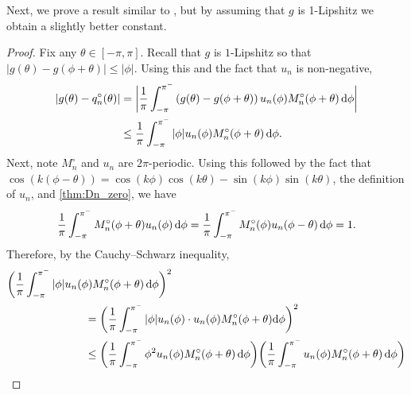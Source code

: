 Next, we prove a result similar to \cite[Lemma 1.7]{rivlin_81}, but by assuming that \( g \) is 1-Lipshitz we obtain a slightly better constant.


\begin{proof}
    Fix any \( \theta \in [-\pi,\pi] \).
    Recall that \( g \) is \( 1 \)-Lipshitz so that \( |g(\theta) - g(\phi+\theta)| \leq |\phi| \).
    Using this and the fact that \( u_n \) is non-negative,
    \begin{align*}
        |g(\theta) - q_n^\circ(\theta)|
        &= \bigg| \frac{1}{\pi} \int_{-\pi}^{\pi^-} \left( g(\theta) - g(\phi+\theta) \right)u_n(\phi) M_n^\circ(\phi+\theta) \,\textup{d}\phi \bigg|
        \\&\leq \frac{1}{\pi} \int_{-\pi}^{\pi^-} |\phi| u_n(\phi) M_n^\circ(\phi+\theta) \,\textup{d}\phi .
    \end{align*}
    Next, note \( M_n^\circ \) and \( u_n \) are \( 2\pi \)-periodic.
    Using this followed by the fact that \( \cos(k(\phi-\theta)) = \cos(k\phi) \cos(k\theta) - \sin(k\phi)\sin(k\theta) \), the definition of \( u_n \), and \cref{thm:Dn_zero}, we have
    \begin{equation*}
        \frac{1}{\pi} \int_{-\pi}^{\pi^-} M_n^\circ(\phi+\theta) u_n(\phi) \,\textup{d}\phi 
        = \frac{1}{\pi} \int_{-\pi}^{\pi^-} M_n^\circ(\phi) u_n(\phi-\theta) \,\textup{d}\phi 
        = 1.
    \end{equation*}
    Therefore, by the Cauchy--Schwarz inequality, 
    \begin{align*}
        \hspace{7em}&\hspace{-7em}\bigg(\frac{1}{\pi} \int_{-\pi}^{\pi^-} |\phi| u_n(\phi) M_n^\circ(\phi+\theta) \,\d\phi \bigg)^2 
        \\&=\bigg(\frac{1}{\pi} \int_{-\pi}^{\pi^-} |\phi| u_n(\phi) \cdot u_n(\phi) M_n^\circ(\phi+\theta)  \d\phi \bigg)^2
        \\&\leq \bigg( \frac{1}{\pi} \int_{-\pi}^{\pi^-} \phi^2 u_n(\phi) M_n^\circ(\phi+\theta) \,\d\phi \bigg)
        \bigg( \frac{1}{\pi} \int_{-\pi}^{\pi^-} u_n(\phi) M_n^\circ(\phi+\theta) \,\d\phi \bigg)

\end{align*}
\end{proof}

